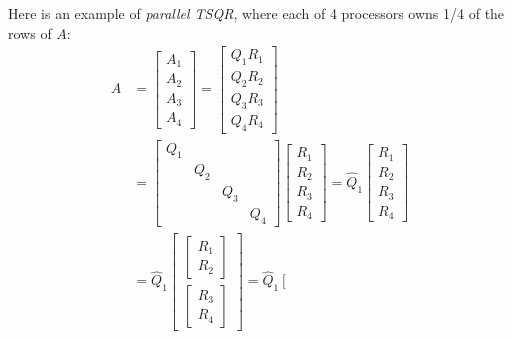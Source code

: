 \documentclass[11pt]{article}
\numberwithin{equation}{section}
\begin{document}
Here is an example of \textit{parallel TSQR}, where each of 4 processors owns 1/4 of the rows of $A$: \begin{align*}
    A &= \left[\begin{array}{l}
        A_{1} \\
        A_{2} \\
        A_{3} \\
        A_{4}
        \end{array}\right] =\left[\begin{array}{l}
            Q_{1} R_{1} \\
            Q_{2} R_{2} \\
            Q_{3} R_{3} \\
            Q_{4} R_{4}
            \end{array}\right] \\
    &= \left[\begin{array}{cccc}
        Q_{1} & & & \\
        & Q_{2} & & \\
        & & Q_{3} & \\
        & & & Q_{4}
        \end{array}\right]\left[\begin{array}{l}
        R_{1} \\
        R_{2} \\
        R_{3} \\
        R_{4}
        \end{array}\right] = \hat{Q}_1 \left[\begin{array}{l}
            R_{1} \\
            R_{2} \\
            R_{3} \\
            R_{4}
            \end{array}\right] \\
    &= \hat{Q}_1 \left[\begin{array}{l}
        \left[\begin{array}{l}
            R_{1} \\
            R_{2} 
            \end{array}\right] \\
        \left[\begin{array}{l}
                R_{3} \\
                R_{4}
                \end{array}\right]
            \end{array}\right] = \hat{Q}_{1}\left[\begin{array}{l}

\end{array}
\end{align*}
\end{document}

